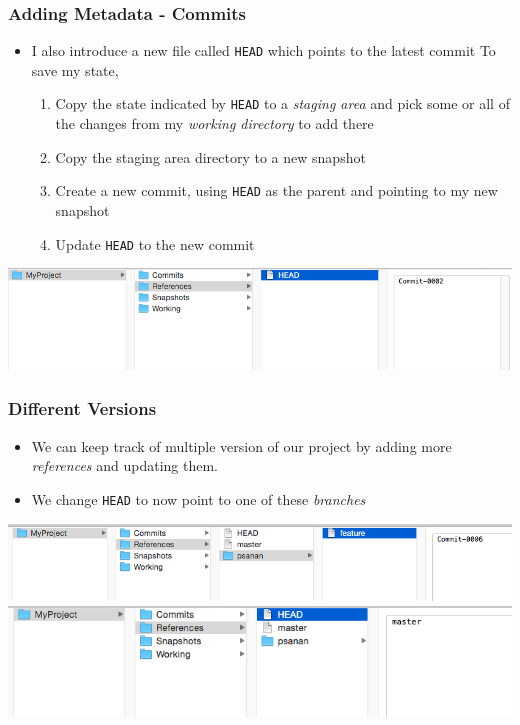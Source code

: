 \documentclass{beamer}
\begin{document}
\begin{frame}[fragile]
\frametitle{Adding Metadata - Commits}
\begin{itemize}
\item I also introduce a new file called \texttt{HEAD} which points to the latest commit
To save my state,
\begin{enumerate}
\item Copy the state indicated by \texttt{HEAD} to a \emph{staging area} and pick some or all of the changes from my \emph{working directory} to add there
\item Copy the staging area directory to a new snapshot
\item Create a new commit, using \texttt{HEAD} as the parent and pointing to my new snapshot
\item Update \texttt{HEAD} to the new commit
\end{enumerate}
\end{itemize}
\includegraphics[scale=0.4]{commit2.png}
\end{frame}

\begin{frame}[fragile]
\frametitle{Different Versions}
\begin{itemize}
\item We can keep track of multiple version of our project by adding more \emph{references} and updating them. 
\item We change \texttt{HEAD} to now point to one of these \emph{branches}
\end{itemize}
\includegraphics[scale=0.4]{branch1.png}\\
\vspace{10px}
\includegraphics[scale=0.4]{branch2.png}
\end{frame}
\end{document}
